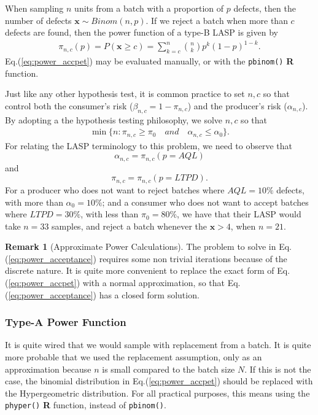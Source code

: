 \documentclass[12pt,a4paper]{report}
\theoremstyle{plain}
\theoremstyle{definition}
\newtheorem{remark}{Remark}
\newcommand{\set}[1]{\{ #1 \}} \newcommand{\setII}[1]{\left\{ #1 \right\}} \newcommand{\rv}[1]{\mathbf{#1}} \newcommand{\x}{\rv x} \newcommand{\y}{\rv y} \newcommand{\U}{\rv u} \newcommand{\T}{\rv t} \newcommand{\X}{\rv X} \newcommand{\Y}{\rv Y} \newcommand{\expect}[1]{\mathbf{E}\left[ #1 \right]} \newcommand{\expectg}[2]{\mathbf{E}_{\rv{#1}}\left[ \rv{#2} \right]} \newcommand{\expectn}[1]{\mathbb{E}\left[#1\right]} \newcommand{\cov}[1]{\mathbf{Cov} \left[ #1 \right]} \newcommand{\var}[1]{\mathop{Var} \left[ #1 \right]} \newcommand{\covn}[1]{\mathbb{Cov} \left[ #1 \right]} \newcommand{\gauss}[1]{\mathcal{N}\left(#1\right)} \newcommand{\cdf}[2]{F_{#1} (#2)} \newcommand{\survive}[2]{S_{#1} (#2)} \newcommand{\hazard}[2]{h_{#1} (#2)} \newcommand{\cuhazard}[2]{H_{#1} (#2)} \newcommand{\cdfn}[2]{\mathbb{F}_{#1}(#2)} \newcommand{\icdf}[2]{F_\rv{#1}^{-1} (#2)} \newcommand{\icdfn}[2]{\mathbb{F}^{-1}_{#1}(#2)} \newcommand{\pdf}[2]{p_{#1} (#2)} \newcommand{\prob}[1]{P\left( #1 \right)} \newcommand{\dist}{P} \newcommand{\density}{p}
\newcommand{\R}{\textnormal{\sffamily\bfseries R }}
\newcommand{\rcode}[1]{\texttt{#1}}
\begin{document}
When sampling $n$ units from a batch with a proportion of $p$ defects, then the number of defects $\x \sim Binom(n,p)$.
If we reject a batch when more than $c$ defects are found, then the power function of a type-B LASP is given by
\begin{align}
\label{eq:power_accpet}
	\pi_{n,c}(p)=P(\x \geq c)= \sum_{k=c}^n \binom{n}{k} p^k (1-p)^{1-k} .
\end{align}
Eq.(\ref{eq:power_accpet}) may be evaluated manually, or with the \rcode{pbinom()} \R function. 

Just like any other hypothesis test, it is common practice to set $n,c$ so that control both the consumer's risk ($\beta_{n,c}=1-\pi_{n,c}$) and the producer's risk ($\alpha_{n,c}$).
By adopting a the hypothesis testing philosophy, we solve $n,c$ so that 
\begin{align}
\label{eq:power_acceptance}
 \min \set{n : \pi_{n,c}\geq \pi_0 \quad and \quad \alpha_{n,c}\leq \alpha_0 }.
\end{align}
For relating the LASP terminology to this problem, we need to observe that $$\alpha_{n,c}=\pi_{n,c}(p=AQL)$$ and $$\pi_{n,c}=\pi_{n,c}(p=LTPD).$$
For a producer who does not want to reject batches where $AQL=10\%$ defects, with more than $\alpha_0=10\%$; 
and a consumer who does not want to accept batches where $LTPD=30\%$, with less than $\pi_0=80\%$, 
we have that their LASP would take $n=33$ samples, and reject a batch whenever the $\x>4$, when $n=21$.
\begin{remark}[Approximate Power Calculations]
The problem to solve in Eq.(\ref{eq:power_acceptance}) requires some non trivial iterations because of the discrete nature.
It is quite more convenient to replace the exact form of Eq.(\ref{eq:power_accpet}) with a normal approximation, so that Eq.(\ref{eq:power_acceptance}) has a closed form solution. 
\end{remark}



\subsubsection{Type-A Power Function}
It is quite wired that we would sample with replacement from a batch.
It is quite more probable that we used the replacement assumption, only as an approximation because $n$ is small compared to the batch size $N$. 
If this is not the case, the binomial distribution in Eq.(\ref{eq:power_accpet}) should be replaced with the Hypergeometric distribution. 
For all practical purposes, this means using the \rcode{phyper()} \R function, instead of \rcode{pbinom()}.
\end{document}
